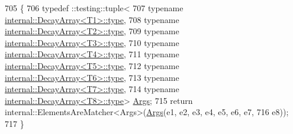 \begin{DoxyCode}
705                                                             \{
706   typedef ::testing::tuple<
707       \textcolor{keyword}{typename} \hyperlink{namespaceupload_a4fc56f0dd6613be15c3c4dc3af3619ce}{internal::DecayArray<T1>::type},
708       \textcolor{keyword}{typename} \hyperlink{namespaceupload_a4fc56f0dd6613be15c3c4dc3af3619ce}{internal::DecayArray<T2>::type},
709       \textcolor{keyword}{typename} \hyperlink{namespaceupload_a4fc56f0dd6613be15c3c4dc3af3619ce}{internal::DecayArray<T3>::type},
710       \textcolor{keyword}{typename} \hyperlink{namespaceupload_a4fc56f0dd6613be15c3c4dc3af3619ce}{internal::DecayArray<T4>::type},
711       \textcolor{keyword}{typename} \hyperlink{namespaceupload_a4fc56f0dd6613be15c3c4dc3af3619ce}{internal::DecayArray<T5>::type},
712       \textcolor{keyword}{typename} \hyperlink{namespaceupload_a4fc56f0dd6613be15c3c4dc3af3619ce}{internal::DecayArray<T6>::type},
713       \textcolor{keyword}{typename} \hyperlink{namespaceupload_a4fc56f0dd6613be15c3c4dc3af3619ce}{internal::DecayArray<T7>::type},
714       \textcolor{keyword}{typename} \hyperlink{namespaceupload_a4fc56f0dd6613be15c3c4dc3af3619ce}{internal::DecayArray<T8>::type}> 
      \hyperlink{namespacetesting_a09ac462e8d6ed468cbfaa9c767aee0aa}{Args};
715   \textcolor{keywordflow}{return} internal::ElementsAreMatcher<Args>(\hyperlink{namespacetesting_a09ac462e8d6ed468cbfaa9c767aee0aa}{Args}(e1, e2, e3, e4, e5, e6, e7,
716       e8));
717 \}
\end{DoxyCode}
